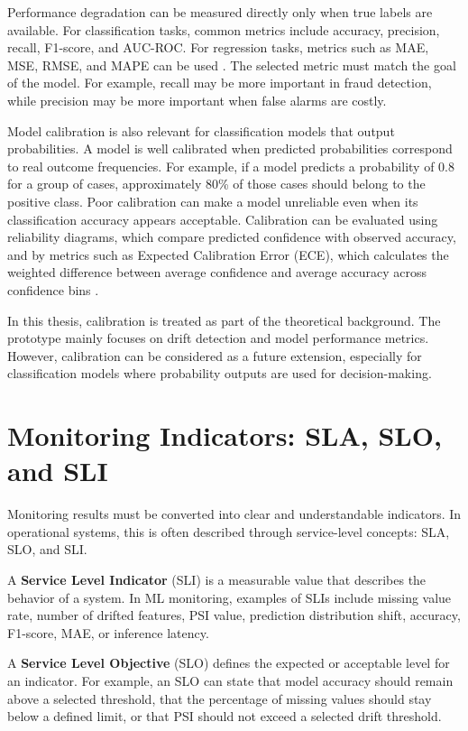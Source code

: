 Performance degradation can be measured directly only when true labels are available. For classification tasks, common metrics include accuracy, precision, recall, F1-score, and AUC-ROC. For regression tasks, metrics such as MAE, MSE, RMSE, and MAPE can be used \cite{ModelMonitoringFrameworks}. The selected metric must match the goal of the model. For example, recall may be more important in fraud detection, while precision may be more important when false alarms are costly.

Model calibration is also relevant for classification models that output probabilities. A model is well calibrated when predicted probabilities correspond to real outcome frequencies. For example, if a model predicts a probability of 0.8 for a group of cases, approximately 80\% of those cases should belong to the positive class. Poor calibration can make a model unreliable even when its classification accuracy appears acceptable. Calibration can be evaluated using reliability diagrams, which compare predicted confidence with observed accuracy, and by metrics such as Expected Calibration Error (ECE), which calculates the weighted difference between average confidence and average accuracy across confidence bins \cite{UnderstandingModelCalibration}.

In this thesis, calibration is treated as part of the theoretical background. The prototype mainly focuses on drift detection and model performance metrics. However, calibration can be considered as a future extension, especially for classification models where probability outputs are used for decision-making.

\section{Monitoring Indicators: SLA, SLO, and SLI}

Monitoring results must be converted into clear and understandable indicators. In operational systems, this is often described through service-level concepts: SLA, SLO, and SLI.

A \textbf{Service Level Indicator} (SLI) is a measurable value that describes the behavior of a system. In ML monitoring, examples of SLIs include missing value rate, number of drifted features, PSI value, prediction distribution shift, accuracy, F1-score, MAE, or inference latency.

A \textbf{Service Level Objective} (SLO) defines the expected or acceptable level for an indicator. For example, an SLO can state that model accuracy should remain above a selected threshold, that the percentage of missing values should stay below a defined limit, or that PSI should not exceed a selected drift threshold.


